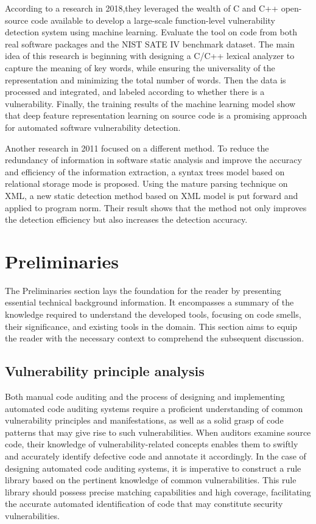 \documentclass[journal]{IEEEtran}
\begin{document}
According to a research in 2018,they leveraged the wealth of C and C++ open-source code available to develop a large-scale function-level vulnerability detection system using machine learning. Evaluate the tool on code from both real software packages and the NIST SATE IV benchmark dataset\cite{8614145}. The main idea of this research is beginning with designing a C/C++ lexical analyzer to capture the meaning of key words, while ensuring the universality of the representation and minimizing the total number of words. Then the data is processed and integrated, and labeled according to whether there is a vulnerability. Finally, the training results of the machine learning model show that deep feature representation learning on source code is a promising approach for automated software vulnerability detection.

Another research in 2011 focused on a different method. To reduce the redundancy of information in software static analysis and improve the accuracy and efficiency of the information extraction, a syntax trees model based on relational storage mode is proposed. Using the mature parsing technique on XML, a new static detection method based on XML model is put forward and applied to program norm\cite{5997729}. Their result shows that the method not only improves the detection efficiency but also increases the detection accuracy.

\section{Preliminaries}
\noindent The Preliminaries section lays the foundation for the reader by presenting essential technical background information. It encompasses a summary of the knowledge required to understand the developed tools, focusing on code smells, their significance, and existing tools in the domain. This section aims to equip the reader with the necessary context to comprehend the subsequent discussion.

\subsection{Vulnerability principle analysis}
Both manual code auditing and the process of designing and implementing automated code auditing systems require a proficient understanding of common vulnerability principles and manifestations, as well as a solid grasp of code patterns that may give rise to such vulnerabilities. When auditors examine source code, their knowledge of vulnerability-related concepts enables them to swiftly and accurately identify defective code and annotate it accordingly. In the case of designing automated code auditing systems, it is imperative to construct a rule library based on the pertinent knowledge of common vulnerabilities. This rule library should possess precise matching capabilities and high coverage, facilitating the accurate automated identification of code that may constitute security vulnerabilities.
\end{document}
